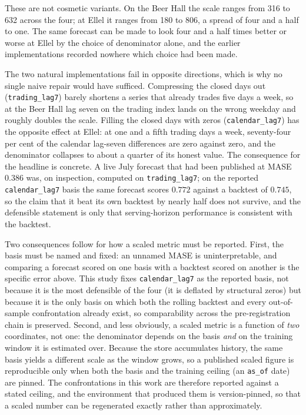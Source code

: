 These are not cosmetic variants. On the Beer Hall the scale ranges from 316 to 632 across
the four; at Ellel it ranges from 180 to 806, a spread of four and a half to one. The same
forecast can be made to look four and a half times better or worse at Ellel by the choice of
denominator alone, and the earlier implementations recorded nowhere which choice had been
made.

The two natural implementations fail in opposite directions, which is why no single naive
repair would have sufficed. Compressing the closed days out (\texttt{trading\_lag7}) barely
shortens a series that already trades five days a week, so at the Beer Hall lag seven on the
trading index lands on the wrong weekday and roughly doubles the scale. Filling the closed
days with zeros (\texttt{calendar\_lag7}) has the opposite effect at Ellel: at one and a
fifth trading days a week, seventy-four per cent of the calendar lag-seven differences are
zero against zero, and the denominator collapses to about a quarter of its honest value.
The consequence for the headline is concrete. A live July forecast that had been published
at MASE $0.386$ was, on inspection, computed on \texttt{trading\_lag7}; on the reported
\texttt{calendar\_lag7} basis the same forecast scores $0.772$ against a backtest of
$0.745$, so the claim that it beat its own backtest by nearly half does not survive, and the
defensible statement is only that serving-horizon performance is consistent with the
backtest.

Two consequences follow for how a scaled metric must be reported. First, the basis must be
named and fixed: an unnamed MASE is uninterpretable, and comparing a forecast scored on one
basis with a backtest scored on another is the specific error above. This study fixes
\texttt{calendar\_lag7} as the reported basis, not because it is the most defensible of the
four (it is deflated by structural zeros) but because it is the only basis on which both the
rolling backtest and every out-of-sample confrontation already exist, so comparability
across the pre-registration chain is preserved. Second, and less obviously, a scaled metric
is a function of \emph{two} coordinates, not one: the denominator depends on the basis
\emph{and} on the training window it is estimated over. Because the store accumulates history,
the same basis yields a different scale as the window grows, so a published scaled figure is
reproducible only when both the basis and the training ceiling (an \texttt{as\_of} date) are
pinned. The confrontations in this work are therefore reported against a stated ceiling, and
the environment that produced them is version-pinned, so that a scaled number can be
regenerated exactly rather than approximately.

